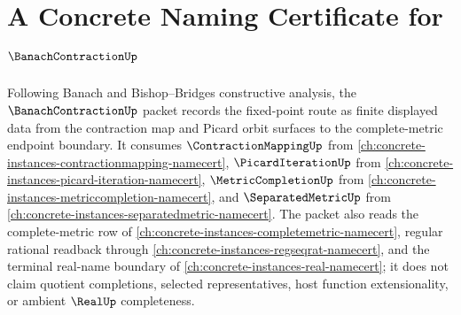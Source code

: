 \chapter{A Concrete Naming Certificate for $\BanachContractionUp$}
\label{ch:concrete-instances-banach-contraction-namecert}

Following Banach and Bishop--Bridges constructive analysis, the $\BanachContractionUp$ packet records the fixed-point route as finite displayed data from the contraction map and Picard orbit surfaces to the complete-metric endpoint boundary. It consumes $\ContractionMappingUp$ from \autoref{ch:concrete-instances-contractionmapping-namecert}, $\PicardIterationUp$ from \autoref{ch:concrete-instances-picard-iteration-namecert}, $\MetricCompletionUp$ from \autoref{ch:concrete-instances-metriccompletion-namecert}, and $\SeparatedMetricUp$ from \autoref{ch:concrete-instances-separatedmetric-namecert}. The packet also reads the complete-metric row of \autoref{ch:concrete-instances-completemetric-namecert}, regular rational readback through \autoref{ch:concrete-instances-regseqrat-namecert}, and the terminal real-name boundary of \autoref{ch:concrete-instances-real-namecert}; it does not claim quotient completions, selected representatives, host function extensionality, or ambient $\RealUp$ completeness.

